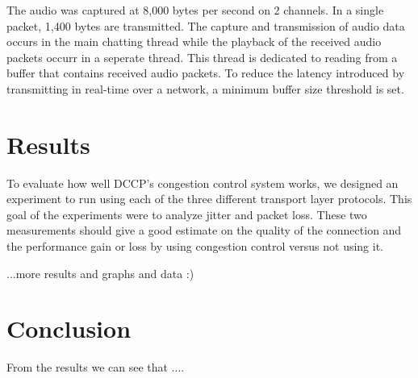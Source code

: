 \documentclass[letterpaper, 9 pt, balance, conference]{ieeeconf}
\begin{document}
The audio was captured at 8,000 bytes per second on 2 channels.  In a 
single packet, 1,400 bytes are transmitted.  The capture and transmission of audio 
data occurs in the main chatting thread while the playback of the received audio 
packets occurr in a seperate thread.  This thread is dedicated to reading from
a buffer that contains received audio packets.  To reduce the latency 
introduced by transmitting in real-time over a network, a minimum buffer size
threshold is set.


\section{Results}
\label{sec:results}

To evaluate how well DCCP's congestion control system works, we designed an 
experiment to run using each of the three different transport layer protocols. This
goal of the experiments were to analyze jitter and packet loss.  These two
measurements should give a good estimate on the quality of the connection and
the performance gain or loss by using congestion control versus not using it.  

...more results and graphs and data :)

\section{Conclusion}
\label{sec:concl}

From the results we can see that ....

\balance

\end{document}
